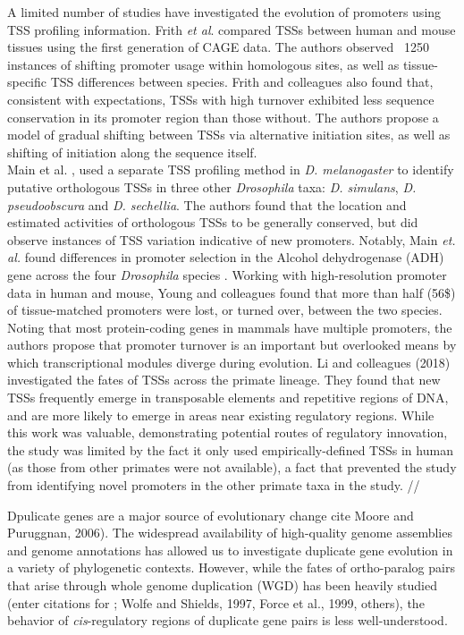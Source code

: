 \documentclass[nogrid]{MBE}%
\begin{document}
A limited number of studies have investigated the evolution of promoters using TSS profiling information. Frith \textit{et al}. \citep{Frith:2006bb} compared TSSs between human and mouse tissues using the first generation of CAGE data. The authors observed ~1250 instances of shifting promoter usage within homologous sites, as well as tissue-specific TSS differences between species. Frith and colleagues also found that, consistent with expectations, TSSs with high turnover exhibited less sequence conservation in its promoter region than those without. The authors propose a model of gradual shifting between TSSs via alternative initiation sites, as well as shifting of initiation along the sequence itself. \\

Main et al. \citep{Main:2013dg}, used a separate TSS profiling method in \textit{D. melanogaster} to identify putative orthologous TSSs in three other \textit{Drosophila} taxa: \textit{D. simulans}, \textit{D. pseudoobscura} and \textit{D. sechellia}. The authors found that the location and estimated activities of orthologous TSSs to be generally conserved, but did observe instances of TSS variation indicative of new promoters. Notably, Main \textit{et. al.} found differences in promoter selection in the Alcohol dehydrogenase (ADH) gene across the four \textit{Drosophila} species \citep{Main:2013dg}. Working with high-resolution promoter data in human and mouse, Young and colleagues \citep{Young:2015xx} found that more than half (56\$) of tissue-matched promoters were lost, or turned over, between the two species. Noting that most protein-coding genes in mammals \citep{FANTOMConsortiumandtheRIKENPMIandCLSTDGT:2014hz} have multiple promoters, the authors propose that promoter turnover is an important but overlooked means by which transcriptional modules diverge during evolution. Li and colleagues (2018) investigated the fates of TSSs across  the primate lineage. They found that new TSSs frequently emerge in transposable elements and repetitive regions of DNA, and are more likely to emerge in areas near existing regulatory regions. While this work was valuable, demonstrating potential routes of regulatory innovation, the study was limited by the fact it only used empirically-defined TSSs in human (as those from other primates were not available), a fact that prevented the study from identifying novel promoters in the other primate taxa in the study. // 

Dpulicate genes are a major source of evolutionary change cite Moore and Puruggnan, 2006). The widespread availability of high-quality genome assemblies and genome annotations has allowed us to investigate duplicate gene evolution in a variety of phylogenetic contexts. However, while the fates of ortho-paralog pairs that arise through whole genome duplication (WGD) has been heavily studied (enter citations for \citep{Ohno:1970wm}; Wolfe and Shields, 1997, Force et al., 1999, others), the behavior of \textit{cis}-regulatory regions of duplicate gene pairs is less well-understood. 
\end{document}

